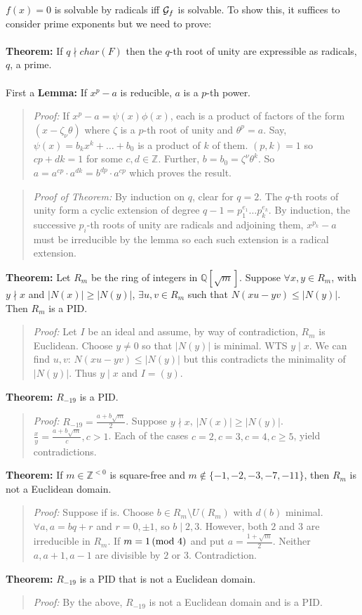 $f(x)=0$ is solvable by radicals iff ${\cal G}_f$ is solvable.  To show this,
it suffices to consider prime exponents but we need
to prove:
\\
\\
{\bf Theorem:} If $q \nmid char(F)$ then the $q$-th root of unity are expressible as radicals, $q$,
a prime.
\\
\\
First a {\bf Lemma:} If $x^p-a$ is reducible, $a$ is a $p$-th power.
\begin{quote}
\emph{Proof:}
If $x^p-a = \psi(x) \phi(x)$, each is a product of factors of the form $(x- \zeta_{\nu} \theta)$ where
$\zeta$ is a $p$-th root of unity and $\theta^p=a$.  Say, $\psi(x)= b_k x^k + \ldots + b_0$ is 
a product of $k$ of them.  $(p,k)=1$ so $cp+dk=1$ for some $c, d \in {\mathbb Z}$.  Further,
$b= b_0= \zeta^{\nu} \theta^k$.  So $a=a^{cp} \cdot a^{dk}= b^{dp} \cdot a^{cp}$ which proves
the result.
\end{quote}
\begin{quote}
\emph{Proof of Theorem:}
By induction on $q$, clear for $q=2$.  The $q$-th roots of unity form a cyclic extension of
degree $q-1= p_1^{e_1} \ldots p_k^{e_k}$.  By induction, the successive $p_i$-th roots of unity
are radicals and adjoining them, $x^{p_k}-a$ must be irreducible by the lemma so each such
extension is a radical extension.
\end{quote}
{\bf Theorem:} Let $R_m$ be the ring of integers in ${\mathbb Q}[{\sqrt m}]$.  Suppose
$\forall x, y\in R_m$, with $y \nmid x$ and $|N(x)| \ge |N(y)|$, $\exists u, v \in R_m$ such that
$N(xu-yv) \leq |N(y)|$. Then $R_m$ is a PID.
\begin{quote}
\emph{Proof:} Let $I$ be an ideal and assume, by way of contradiction, $R_m$ is Euclidean.
Choose $y \ne 0$ so that $|N(y)|$ is minimal.  WTS $y \mid x$.  We can find
$u, v$: $N(xu-yv) \leq |N(y)|$ but this contradicts the minimality of $|N(y)|$.  Thus
$y \mid x$ and $I = (y)$.
\end{quote}
{\bf Theorem:} $R_{-19}$ is a PID.
\begin{quote}
\emph{Proof:} $R_{-19} = {\frac {a + b {\sqrt m}} {2}}$.  Suppose $y \nmid x$, $|N(x)| \geq |N(y)|$.
${\frac {x} {y}} = {\frac {a + b {\sqrt m}} {c}}, c > 1$.  Each of the cases $c=2, c=3, c=4, c \geq 5$,
yield contradictions.
\end{quote}
{\bf Theorem:} If $m \in {\mathbb Z}^{<0}$ is square-free and $m \notin \{-1, -2, -3, -7, -11 \}$,
then $R_m$ is not a Euclidean domain.
\begin{quote}
\emph{Proof:}
Suppose if is.  Choose $b \in R_m \setminus U(R_m)$ with $d(b)$ minimal.
$\forall a, a=bq+r$ and $r =0, \pm  1$, so $b \mid 2, 3$.  However,
both $2$ and $3$ are irreducible in $R_m$.  If $m = 1 \thinspace \textnormal{(mod } 4 \textnormal{)}$ and put $a= {\frac {1 + {\sqrt m}} {2}}$.
Neither $a, a+1, a-1$ are divisible by $2$ or $3$.  Contradiction.
\end{quote}
{\bf Theorem:} $R_{-19}$ is a PID that is not a Euclidean domain.
\begin{quote}
\emph{Proof:}  By the above, $R_{-19}$ is not a Euclidean domain and is a PID.
\end{quote}
